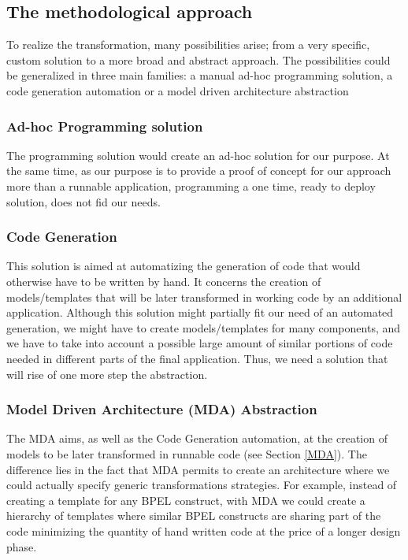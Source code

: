 \subsection{The methodological approach}
\label{sec:ProgrammingVsMDE}
To realize the transformation, many possibilities arise; from a very specific, custom solution to a more broad and abstract approach. The possibilities could be generalized in three main families: a manual ad-hoc programming solution, a code generation automation or a model driven architecture abstraction
  \subsubsection{Ad-hoc Programming solution}
The programming solution would create an ad-hoc solution for our purpose.  At the same time, as our purpose is to provide a proof of concept for our approach more than a runnable application, programming a one time, ready to deploy solution, does not fid our needs.
  \subsubsection{Code Generation}
This solution is aimed at automatizing the generation of code that would otherwise have to be written by hand. It concerns the creation of models/templates that will be later transformed in working code by an additional application. Although this solution might partially fit our need of an automated generation, we might have to create models/templates for many components, and we have to take into account a possible large amount of similar portions of code needed in different parts of the final application.  Thus, we need a solution that will rise of one more step the abstraction.
  
 \subsubsection{Model Driven Architecture (MDA) Abstraction}
The MDA aims, as well as the Code Generation automation, at the creation of models to be later transformed in runnable code (see Section \ref{MDA}). The difference lies in the fact that MDA permits to create an architecture where we could actually specify generic transformations strategies. For example, instead of creating a template for any BPEL construct, with MDA we could create a hierarchy of templates where similar BPEL constructs are sharing part of the code minimizing the quantity of hand written code at the price of a longer design phase.
